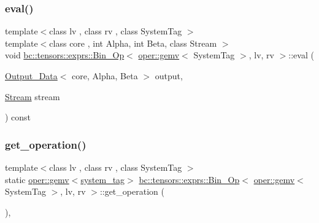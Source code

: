 \subsubsection{\texorpdfstring{eval()}{eval()}}
{\footnotesize\ttfamily template$<$class lv , class rv , class System\+Tag $>$ \\
template$<$class core , int Alpha, int Beta, class Stream $>$ \\
void \hyperlink{structbc_1_1tensors_1_1exprs_1_1Bin__Op}{bc\+::tensors\+::exprs\+::\+Bin\+\_\+\+Op}$<$ \hyperlink{structbc_1_1oper_1_1gemv}{oper\+::gemv}$<$ System\+Tag $>$, lv, rv $>$\+::eval (\begin{DoxyParamCaption}\item[{\hyperlink{structbc_1_1tensors_1_1exprs_1_1Output__Data}{Output\+\_\+\+Data}$<$ core, Alpha, Beta $>$}]{output,  }\item[{\hyperlink{classbc_1_1streams_1_1Stream}{Stream}}]{stream }\end{DoxyParamCaption}) const\hspace{0.3cm}{\ttfamily [inline]}}

\mbox{\label{structbc_1_1tensors_1_1exprs_1_1Bin__Op_3_01oper_1_1gemv_3_01SystemTag_01_4_00_01lv_00_01rv_01_4_aa6172a36f7b36dc1889faf5e48709234}} 
\subsubsection{\texorpdfstring{get\+\_\+operation()}{get\_operation()}}
{\footnotesize\ttfamily template$<$class lv , class rv , class System\+Tag $>$ \\
static \hyperlink{structbc_1_1oper_1_1gemv}{oper\+::gemv}$<$\hyperlink{structbc_1_1tensors_1_1exprs_1_1Bin__Op_3_01oper_1_1gemv_3_01SystemTag_01_4_00_01lv_00_01rv_01_4_a18ec8659904c80f74cf3c865349e0785}{system\+\_\+tag}$>$ \hyperlink{structbc_1_1tensors_1_1exprs_1_1Bin__Op}{bc\+::tensors\+::exprs\+::\+Bin\+\_\+\+Op}$<$ \hyperlink{structbc_1_1oper_1_1gemv}{oper\+::gemv}$<$ System\+Tag $>$, lv, rv $>$\+::get\+\_\+operation (\begin{DoxyParamCaption}{ }\end{DoxyParamCaption})\hspace{0.3cm}{\ttfamily [inline]}, {\ttfamily [static]}}

